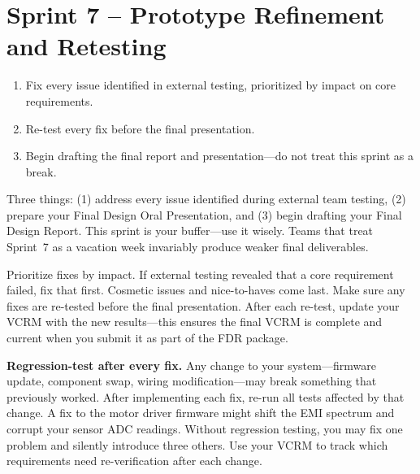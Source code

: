 \documentclass[11pt,letterpaper]{article}
\begin{document}
\section{Sprint 7 -- Prototype Refinement and Retesting}

\begin{priorities}
\begin{enumerate}[leftmargin=*, itemsep=1pt, topsep=0pt]
    \item Fix every issue identified in external testing, prioritized by impact on core requirements.
    \item Re-test every fix before the final presentation.
    \item Begin drafting the final report and presentation---do not treat this sprint as a break.
\end{enumerate}
\end{priorities}

\begin{faqbox}
Three things: (1) address every issue identified during external team testing, (2) prepare your Final Design Oral Presentation, and (3) begin drafting your Final Design Report. This sprint is your buffer---use it wisely. Teams that treat Sprint~7 as a vacation week invariably produce weaker final deliverables.
\end{faqbox}

\begin{tipbox}
Prioritize fixes by impact. If external testing revealed that a core requirement failed, fix that first. Cosmetic issues and nice-to-haves come last. Make sure any fixes are re-tested before the final presentation. After each re-test, update your VCRM with the new results---this ensures the final VCRM is complete and current when you submit it as part of the FDR package.
\end{tipbox}

\begin{warnbox}
\textbf{Regression-test after every fix.} Any change to your system---firmware update, component swap, wiring modification---may break something that previously worked. After implementing each fix, re-run all tests affected by that change. A fix to the motor driver firmware might shift the EMI spectrum and corrupt your sensor ADC readings. Without regression testing, you may fix one problem and silently introduce three others. Use your VCRM to track which requirements need re-verification after each change.
\end{warnbox}
\end{document}
